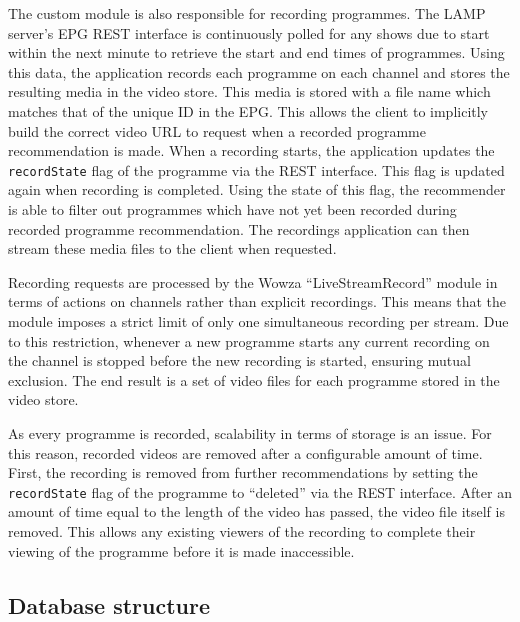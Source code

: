 The custom module is also responsible for recording programmes. The LAMP server's EPG REST interface is continuously polled for any shows due to start within the next minute to retrieve the start and end times of programmes. Using this data, the application records each programme on each channel and stores the resulting media in the video store. This media is stored with a file name which matches that of the unique ID in the EPG. This allows the client to implicitly build the correct video URL to request when a recorded programme recommendation is made. When a recording starts, the application updates the \texttt{recordState} flag of the programme via the REST interface. This flag is updated again when recording is completed. Using the state of this flag, the recommender is able to filter out programmes which have not yet been recorded during recorded programme recommendation. The recordings application can then stream these media files to the client when requested.

Recording requests are processed by the Wowza ``LiveStreamRecord'' module in terms of actions on channels rather than explicit recordings. This means that the module imposes a strict limit of only one simultaneous recording per stream. Due to this restriction, whenever a new programme starts any current recording on the channel is stopped before the new recording is started, ensuring mutual exclusion. The end result is a set of video files for each programme stored in the video store.

As every programme is recorded, scalability in terms of storage is an issue. For this reason, recorded videos are removed after a configurable amount of time. First, the recording is removed from further recommendations by setting the \texttt{recordState} flag of the programme to ``deleted'' via the REST interface. After an amount of time equal to the length of the video has passed, the video file itself is removed. This allows any existing viewers of the recording to complete their viewing of the programme before it is made inaccessible.

\subsection{Database structure}


